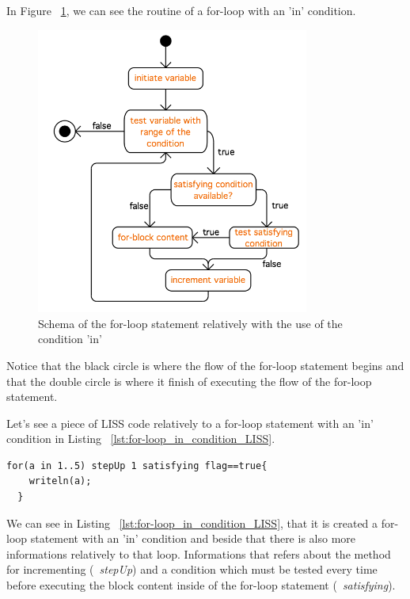 \documentclass[
  oneside,
  11pt, a4paper,
  footinclude=true,
  headinclude=true,
  cleardoublepage=empty
]{scrbook}
\begin{document}
In Figure ~\ref{fig:for-loop_in}, we can see the routine of a for-loop with an 'in' condition.

\begin{figure}[h!]
  \centering
    \includegraphics[width=0.8\textwidth]{img/for-loop_in.png}
    \caption{Schema of the for-loop statement relatively with the use of the condition 'in'}
    \label{fig:for-loop_in}
\end{figure}

Notice that the black circle is where the flow of the for-loop statement begins and that the double circle is where it finish of executing the flow of the for-loop statement.

Let's see a piece of LISS code relatively to a for-loop statement with an 'in' condition in Listing ~\ref{lst:for-loop_in_condition_LISS}.

\begin{lstlisting}[caption={Example of a for-loop statement with 'in' condition in LISS},label={lst:for-loop_in_condition_LISS}]
  for(a in 1..5) stepUp 1 satisfying flag==true{
    writeln(a);
  }
\end{lstlisting}

We can see in Listing ~\ref{lst:for-loop_in_condition_LISS}, that it is created a for-loop statement with an 'in' condition and beside that there is also more informations relatively to that loop. Informations that refers about the method for incrementing (~\textit{stepUp}) and a condition which must be tested every time before executing the block content inside of the for-loop statement (~\textit{satisfying}).
\end{document}
